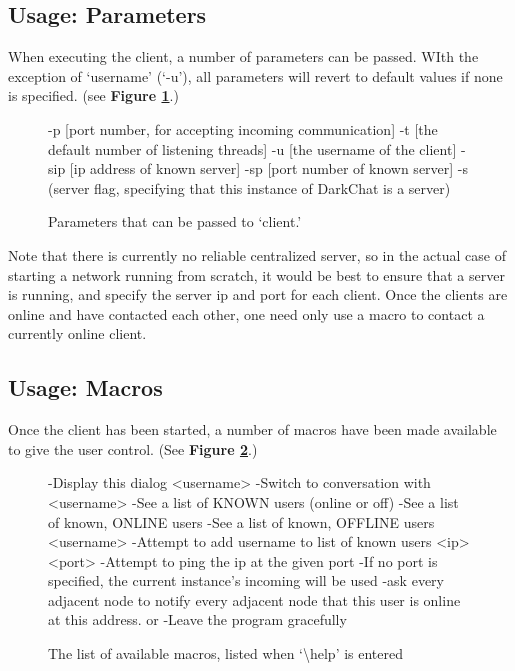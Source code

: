 \documentclass[11pt]{article}
\begin{document}
\subsection{Usage: Parameters}

When executing the client, a number of parameters can be passed. WIth the exception of `username' (`-u'), all parameters will revert to default values if none is specified. (see {\bf Figure \ref{params}}.)

\begin{figure}
\caption{Parameters that can be passed to `client.'}
\begin{code}
-p [port number, for accepting incoming communication]
-t [the default number of listening threads]
-u [the username of the client]
-sip [ip address of known server]
-sp [port number of known server]
-s (server flag, specifying that this instance of DarkChat is a server)
\end{code}
\label{params}
\end{figure}

Note that there is currently no reliable centralized server, so in the actual case of starting a network running from scratch, it would be best to ensure that a server is running, and specify the server ip and port for each client. Once the clients are online and have contacted each other, one need only use a macro to contact a currently online client.

\subsection{Usage: Macros}

Once the client has been started, a number of macros have been made available to give the user control. (See {\bf Figure \ref{macros}}.)
\begin{figure}
\caption{The list of available macros, listed when `\textbackslash help' is entered}
\begin{code}
  \help
   -Display this dialog
  \chat <username>
   -Switch to conversation with <username>
  \users
   -See a list of KNOWN users (online or off)
  \online
   -See a list of known, ONLINE users
  \offline
   -See a list of known, OFFLINE users
  \add <username>
   -Attempt to add username to list of known users
  \ping <ip> <port>
   -Attempt to ping the ip at the given port
   -If no port is specified, the current instance's incoming will be used
  \explode
   -ask every adjacent node to notify every adjacent node that this user is 
    online at this address.
  \quit or \exit
   -Leave the program gracefully
\end{code}
\label{macros}
\end{figure}
\end{document}
